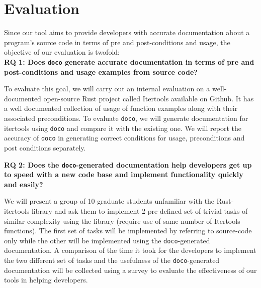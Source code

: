 \section{Evaluation}

Since our tool aims to provide developers with accurate documentation about a program's source code in terms of pre and post-conditions and usage, the objective of our evaluation is twofold:\\
\newline
{\bf RQ 1: Does \texttt{doco} generate accurate documentation in terms of pre and post-conditions and usage examples from source code?}

To evaluate this goal, we will carry out an internal evaluation on a well-documented open-source Rust project called Itertools available on Github.\cite{bluss:2018} It has a well documented collection of usage of function examples along with their associated preconditions. To evaluate \texttt{doco}, we will generate documentation for itertools using \texttt{doco} and compare it with the existing one. We will report the accuracy of \texttt{doco} in generating correct conditions for usage, preconditions and post conditions separately.\newline

{\bf RQ 2: Does the \texttt{doco}-generated documentation help developers get up to speed with a new code base and implement functionality quickly and easily?}

We will present a group of 10 graduate students unfamiliar with the Rust-itertools library and ask them to implement 2 pre-defined set of trivial tasks of similar complexity using the library  (require use of same number of Itertools functions). The first set of tasks will be implemented by referring to source-code only while the other will be implemented using the \texttt{doco}-generated documentation. A comparison of the time it took for the developers to implement the two different set of tasks and the usefulness of the \texttt{doco}-generated documentation will be collected using a survey to evaluate the effectiveness of our tools in helping developers.

